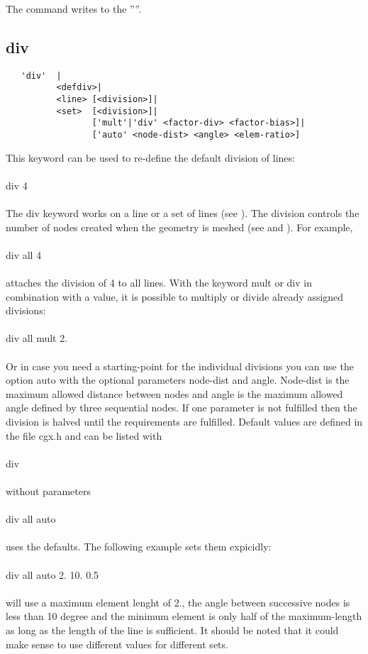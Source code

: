 \documentclass{article}
\begin{document}
The command writes to the ''''.
 
\subsection{\label{div}div}
\begin{verbatim}
   'div'  |
          <defdiv>|
          <line> [<division>]|
          <set>  [<division>]|
                 ['mult'|'div' <factor-div> <factor-bias>]|
                 ['auto' <node-dist> <angle> <elem-ratio>] 
\end{verbatim}
This keyword can be used to re-define the default division of lines:\\\\div 4\\\\The div keyword works on a line or a set of lines (see ). The division controls the number of nodes created when the geometry is meshed (see  and ). For example,\\\\
div all 4\\\\attaches the division of 4 to all lines. With the keyword mult or div in combination with a value, it is possible to multiply or divide already assigned divisions:\\\\
div all mult 2.\\\\Or in case you need a starting-point for the individual divisions you can use the option auto with the optional parameters node-dist and angle. Node-dist is the maximum allowed distance between nodes and angle is the maximum allowed angle defined by three sequential nodes. If one parameter is not fulfilled then the division is halved until the requirements are fulfilled. Default values are defined in the file cgx.h and can be listed with\\\\div\\\\without parameters\\\\
div all auto\\\\uses the defaults. The following example sets them expicidly:\\\\div all auto 2. 10. 0.5\\\\will use a maximum element lenght of 2., the angle between successive nodes is less than 10 degree and the minimum element is only half of the maximum-length as long as the length of the line is sufficient. It should be noted that it could make sense to use different values for different sets.
  
\end{document}
